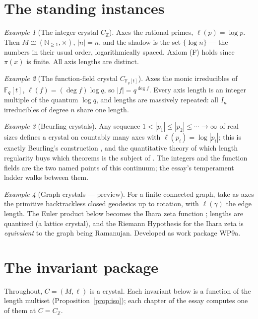 \documentclass[11pt]{article}
\theoremstyle{remark}
\newtheorem{example}{Example}
\newcommand{\N}{\mathbb{N}}
\newcommand{\Z}{\mathbb{Z}}
\newcommand{\F}{\mathbb{F}}
\begin{document}
\section{The standing instances}

\begin{example}[The integer crystal $C_{\Z}$]
Axes the rational primes, $\ell(p) = \log p$. Then $M \cong (\N_{\ge 1}, \times)$, $|n| = n$, and
the shadow is the set $\{\log n\}$ --- the numbers in their usual order, logarithmically spaced.
Axiom (F) holds since $\pi(x)$ is finite. All axis lengths are distinct.
\end{example}

\begin{example}[The function-field crystal $C_{\F_q[t]}$]
Axes the monic irreducibles of $\F_q[t]$, $\ell(f) = (\deg f)\log q$, so $|f| = q^{\deg f}$. Every
axis length is an integer multiple of the quantum $\log q$, and lengths are massively repeated: all
$I_n$ irreducibles of degree $n$ share one length.
\end{example}

\begin{example}[Beurling crystals]
Any sequence $1 < |p_1| \le |p_2| \le \cdots \to \infty$ of real sizes defines a crystal on
countably many axes with $\ell(p_i) = \log|p_i|$; this is exactly Beurling's construction
\cite{Beurling}, and the quantitative theory of which length regularity buys which theorems is the
subject of \cite{DiamondZhang, DMV}. The integers and the function fields are the two named points
of this continuum; the essay's temperament ladder \cite{Essay} walks between them.
\end{example}

\begin{example}[Graph crystals --- preview]
For a finite connected graph, take as axes the primitive backtrackless closed geodesics up to
rotation, with $\ell(\gamma)$ the edge length. The Euler product below becomes the Ihara zeta
function \cite{Terras}; lengths are quantized (a lattice crystal), and the Riemann Hypothesis for
the Ihara zeta is \emph{equivalent} to the graph being Ramanujan. Developed as work package WP9a.
\end{example}

\section{The invariant package}

Throughout, $C = (M, \ell)$ is a crystal. Each invariant below is a function of the length multiset
(Proposition~\ref{prop:iso}); each chapter of the essay \cite{Essay} computes one of them at
$C = C_{\Z}$.
\end{document}

